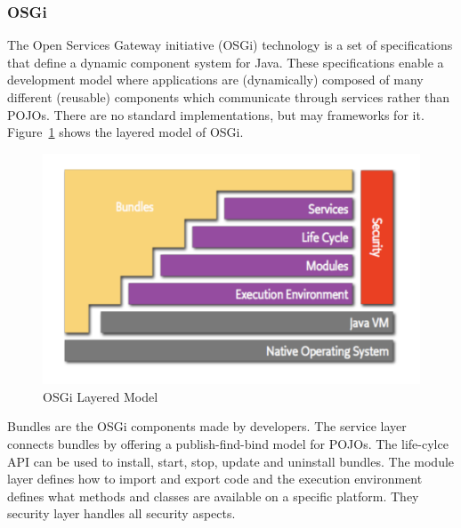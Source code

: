 \subsubsection{OSGi}
The Open Services Gateway initiative (OSGi) technology is a set of specifications that define a dynamic component system for Java.
These specifications enable a development model where applications are (dynamically) composed of many different (reusable) components which communicate through services rather than POJOs.
There are no standard implementations, but may frameworks for it.\\
Figure~\ref{fig:osgi} shows the layered model of OSGi.
\begin{figure}[h]
  \centering
  \includegraphics[width=.8\textwidth]{images/osgi.png}
  \caption{OSGi Layered Model}\label{fig:osgi}
\end{figure}
Bundles are the OSGi components made by developers.
The service layer connects bundles by offering a publish-find-bind model for POJOs.
The life-cylce API can be used to install, start, stop, update and uninstall bundles.
The module layer defines how to import and export code and the execution environment defines what methods and classes are available on a specific platform.
They security layer handles all security aspects.\\

